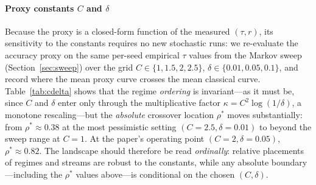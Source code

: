 \documentclass[sensors,article,submit,pdftex,moreauthors]{Definitions/mdpi}
\providecommand{\DIFadd}[1]{{\protect\color{blue}#1}} %
\providecommand{\DIFaddbegin}{} %
\begin{document}
\DIFaddbegin \paragraph{\DIFadd{Proxy constants $C$ and $\delta$}} \DIFadd{Because the proxy is a closed-form function of the measured $(\tau, r)$, its sensitivity to the constants requires no new stochastic runs: we re-evaluate the accuracy proxy on the same per-seed empirical $\tau$ values from the Markov sweep (Section~\ref{sec:sweep}) over the grid $C \in \{1, 1.5, 2, 2.5\}$, $\delta \in \{0.01, 0.05, 0.1\}$, and record where the mean proxy curve crosses the mean classical curve. Table~\ref{tab:cdelta} shows that the regime }\emph{\DIFadd{ordering}} \DIFadd{is invariant---as it must be, since $C$ and $\delta$ enter only through the multiplicative factor $\kappa = C^{2}\log(1/\delta)$, a monotone rescaling---but the }\emph{\DIFadd{absolute}} \DIFadd{crossover location $\rho^{*}$ moves substantially: from $\rho^{*} \approx 0.38$ at the most pessimistic setting $(C{=}2.5, \delta{=}0.01)$ to beyond the sweep range at $C = 1$. At the paper's operating point $(C{=}2, \delta{=}0.05)$, $\rho^{*} \approx 0.82$. The landscape should therefore be read }\emph{\DIFadd{ordinally}}\DIFadd{: relative placements of regimes and streams are robust to the constants, while any absolute boundary---including the $\rho^{*}$ values above---is conditional on the chosen $(C, \delta)$.
}
\end{document}
